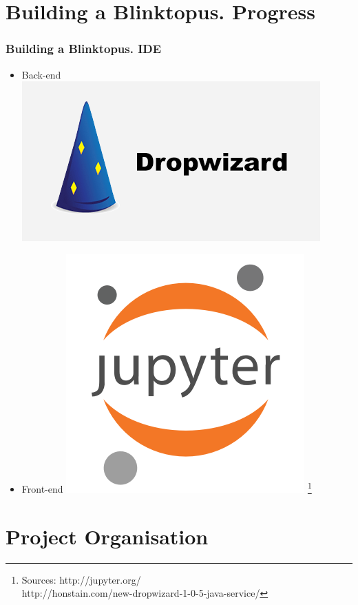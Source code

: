 \documentclass{beamer}
\begin{document}
\section{Building a Blinktopus. Progress}
\begin{frame}
\frametitle{Building a Blinktopus. IDE}
\begin{itemize}
\item{Back-end}
\includegraphics[scale=0.3]{img/dropwizard.png}
\vspace{0.25 cm}
\item{Front-end}
\includegraphics[scale=0.2]{img/jpnotebook.png}
\footnote{\tiny 
Sources: http://jupyter.org/\\
http://honstain.com/new-dropwizard-1-0-5-java-service/}
\end{itemize}
\end{frame}

\section{Project Organisation}
\end{document}
